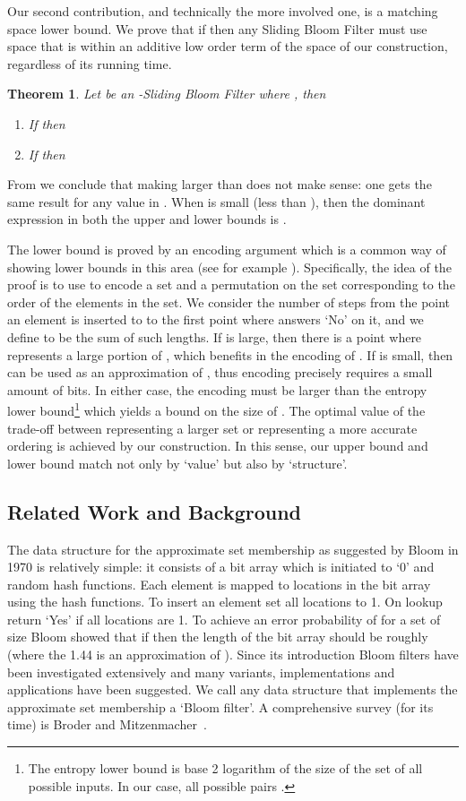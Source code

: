 \documentclass[11pt]{article}
\newtheorem{theorem}{Theorem}[section]
\begin{document}
Our second contribution, and technically the more involved one, is a matching space lower bound. We prove that if  then any Sliding Bloom Filter must use space that is within an additive low order term of the space of our construction, regardless of its running time.

\begin{theorem}\label{LowerBoundNumber}
Let  be an -Sliding Bloom Filter where , then
\begin{enumerate}
\item If  then 
\item If  then 
\end{enumerate}
\end{theorem}

From  we conclude that making  larger than  does not make sense: one gets the same result for any value in .
When  is small (less than ), then the dominant expression in both the upper and lower bounds is .

The lower bound is proved by an encoding argument which is a common way of showing lower bounds in this area (see for example \cite{PaghSW12}). Specifically, the idea of the proof is to use  to encode a set  and a permutation  on the set corresponding to the order of the elements in the set. We consider the number of steps from the point an element is inserted to  to the first point where  answers `No' on it, and we define  to be the sum of  such lengths. If  is large, then there is a point where  represents a large portion of , which benefits in the encoding of . If  is small, then  can be used as an approximation of , thus encoding  precisely requires a small amount of bits. In either case, the encoding must be larger than the entropy lower bound\footnote{The entropy lower bound is base 2 logarithm of the size of the set of all possible inputs. In our case, all possible pairs .} which yields a bound on the size of . The optimal value of the trade-off between representing a larger set or representing a more accurate ordering is achieved by our construction. In this sense, our upper bound and lower bound match not only by `value' but also by `structure'.

\subsection{Related Work and Background}\label{related}
The data structure for the approximate set membership as suggested by Bloom in 1970 \cite{Bloom70} is relatively simple: it consists of a bit array which is initiated to `0' and  random hash functions. Each element is mapped to  locations in the bit array using the hash functions. To insert an element set all  locations to 1. On lookup return `Yes' if all  locations are 1. To achieve an error probability of  for a set of size  Bloom showed that if  then the length of the bit array should be roughly  (where the 1.44 is an approximation of ). Since its introduction Bloom filters have been investigated extensively and many variants, implementations and applications have been suggested. We call any data structure that implements the approximate set membership a `Bloom filter'. A comprehensive survey (for its time) is Broder and Mitzenmacher~\cite{BroderM03}.
\end{document}
